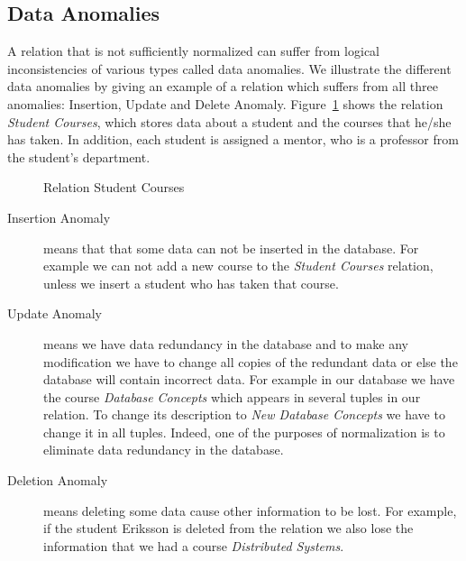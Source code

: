 \subsection{Data Anomalies}
A relation that is not sufficiently normalized can suffer from logical inconsistencies of various types
called data anomalies. We illustrate the different data anomalies by
giving an example of a relation which suffers from all three anomalies: Insertion, Update and
Delete Anomaly. Figure~\ref{fig:relsc1nf}
shows the relation \textit{Student Courses}, which stores data about a student and the courses 
that he/she has taken. In addition, each student is assigned a mentor, who is 
a professor from the student's department. 


%    

\begin{figure}
\begin{center}

\caption{Relation Student Courses}\label{fig:relsc1nf}
\end{center}
\end{figure}

\begin{description}
  \item[Insertion Anomaly] means that that some data can not be 
    inserted in the database. For example we can not add a new course to the \textit{Student Courses}
    relation, unless we insert a student who has taken that course.
  \item[Update Anomaly] means we have data redundancy in the database and to make any 
    modification we have to change all copies of the redundant data or else the 
    database will contain incorrect data. For example in our database we have the course 
    \textit{Database Concepts} which appears in several tuples in our relation. 
    To change its description to \textit{New Database Concepts} we have to change 
    it in all tuples. Indeed, one of the purposes of normalization is to eliminate data 
    redundancy in the database.
  \item[Deletion Anomaly] means deleting some data cause other information to be lost. 
    For example, if the student Eriksson is deleted from the relation we also lose the 
    information that we had a course \textit{Distributed Systems}.
\end{description}

